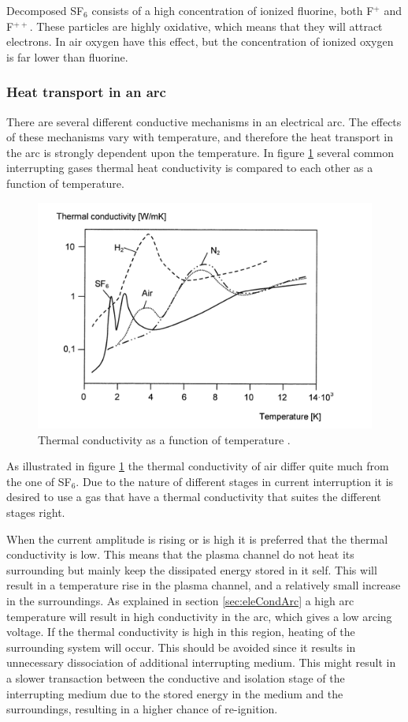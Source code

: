 \documentclass[10pt,a4paper]{article} %
\begin{document}
Decomposed SF$_6$ consists of a high concentration of ionized fluorine, both F$^{+}$ and F$^{++}$. These particles are highly oxidative, which means that they will attract electrons. In air oxygen have this effect, but the concentration of ionized oxygen is far lower than fluorine.
   
\subsubsection{Heat transport in an arc} \label{sec:HeatTransport}
There are several different conductive mechanisms in an electrical arc. The effects of these mechanisms vary with temperature, and therefore the heat transport in the arc is strongly dependent upon the temperature. In figure \ref{fig:tempConGas} several common interrupting gases thermal heat conductivity is compared to each other as a function of temperature.

\begin{figure}[H]
\centering
\includegraphics[scale=0.8]{Bilder/Theory/thermalCond.png}
\caption{Thermal conductivity as a function of temperature \cite{bib:HVEbreak}.} \label{fig:tempConGas}
\end{figure}

As illustrated in figure \ref{fig:tempConGas} the thermal conductivity of air differ quite much from the one of SF$_6$. Due to the nature of different stages in current interruption it is desired to use a gas that have a thermal conductivity that suites the different stages right. 

When the current amplitude is rising or is high it is preferred that the thermal conductivity is low. This means that the plasma channel do not heat its surrounding but mainly keep the dissipated energy stored in it self. This will result in a temperature rise in the plasma channel, and a relatively small increase in the surroundings. As explained in section \ref{sec:eleCondArc} a high arc temperature will result in high conductivity in the arc, which gives a low arcing voltage. If the thermal conductivity is high in this region, heating of the surrounding system will occur. This should be avoided since it results in unnecessary dissociation of additional interrupting medium. This might result in a slower transaction between the conductive and isolation stage of the interrupting medium due to the stored energy in the medium and the surroundings, resulting in a higher chance of re-ignition.
\end{document}
